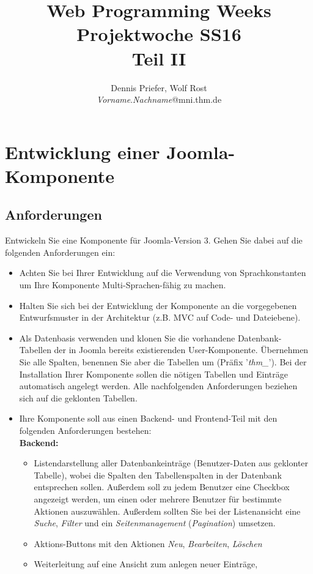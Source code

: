 \documentclass[]{article}
\title{Web Programming Weeks Projektwoche SS16\\ Teil II}
\author{Dennis Priefer, Wolf Rost\\\textit{Vorname}.\textit{Nachname}@mni.thm.de}
\begin{document}
\maketitle

\section{Entwicklung einer Joomla-Komponente}
\subsection{Anforderungen}
Entwickeln Sie eine Komponente für Joomla-Version 3. Gehen Sie dabei auf die folgenden Anforderungen ein:
\begin{itemize}
	\item Achten Sie bei Ihrer Entwicklung auf die Verwendung von Sprachkonstanten um Ihre Komponente Multi-Sprachen-fähig zu machen.
	\item Halten Sie sich bei der Entwicklung der Komponente an die vorgegebenen Entwurfsmuster in der Architektur (z.B. MVC auf Code- und Dateiebene).
	\item Als Datenbasis verwenden und klonen Sie die vorhandene Datenbank-Tabellen der in Joomla bereits existierenden User-Komponente. Übernehmen Sie alle Spalten, benennen Sie aber die Tabellen um (Präfix '\textit{thm\_}'). Bei der Installation Ihrer Komponente sollen die nötigen Tabellen und Einträge automatisch angelegt werden. Alle nachfolgenden Anforderungen beziehen sich auf die geklonten Tabellen.
	\item Ihre Komponente soll aus einen Backend- und Frontend-Teil mit den folgenden Anforderungen bestehen:\\
	\textbf{Backend:}
	\begin{itemize}
		\item Listendarstellung aller Datenbankeinträge (Benutzer-Daten aus geklonter Tabelle), wobei die Spalten den Tabellenspalten in der Datenbank entsprechen sollen. Außerdem soll zu jedem Benutzer eine Checkbox angezeigt werden, um einen oder mehrere Benutzer für bestimmte Aktionen auszuwählen. Außerdem sollten Sie bei der Listenansicht eine \textit{Suche}, \textit{Filter} und ein \textit{Seitenmanagement} (\textit{Pagination}) umsetzen.
		\item Aktions-Buttons mit den Aktionen \textit{Neu}, \textit{Bearbeiten}, \textit{Löschen}
		\item Weiterleitung auf eine Ansicht zum anlegen neuer Einträge, 
		\begin{itemize}

\end{itemize}
\end{itemize}
\end{itemize}
\end{document}
